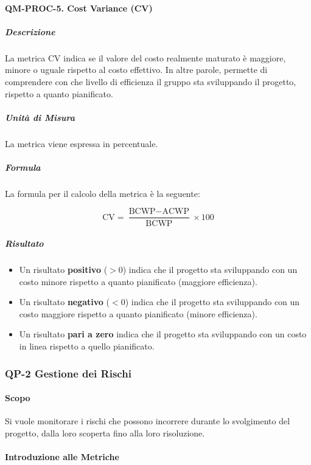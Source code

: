 		\paragraph{QM-PROC-5. Cost Variance (CV)}

			\subparagraph{Descrizione}
			La metrica CV indica se il valore del costo realmente maturato è maggiore, minore o uguale rispetto al costo effettivo. In altre parole, permette di comprendere con che livello di efficienza il gruppo sta sviluppando il progetto, rispetto a quanto pianificato.

			\subparagraph{Unità di Misura}
			La metrica viene espressa in percentuale.

			\subparagraph{Formula}
			La formula per il calcolo della metrica è la seguente:

			\[
				\text{CV} = \frac{\text{BCWP} - \text{ACWP}}{\text{BCWP}} \times 100
			\]

			\subparagraph{Risultato}
			\begin{itemize}
				\item Un risultato \textbf{positivo} (\(> 0\)) indica che il progetto sta sviluppando con un costo minore rispetto a quanto pianificato (maggiore efficienza).
				\item Un risultato \textbf{negativo} (\(< 0\)) indica che il progetto sta sviluppando con un costo maggiore rispetto a quanto pianificato (minore efficienza).
				\item Un risultato \textbf{pari a zero} indica che il progetto sta sviluppando con un costo in linea rispetto a quello pianificato.
			\end{itemize}

	\subsubsection{QP-2 Gestione dei Rischi}

		\paragraph{Scopo}

		Si vuole monitorare i rischi che possono incorrere durante lo svolgimento del progetto, dalla loro scoperta fino alla loro risoluzione.

		\paragraph{Introduzione alle Metriche}

